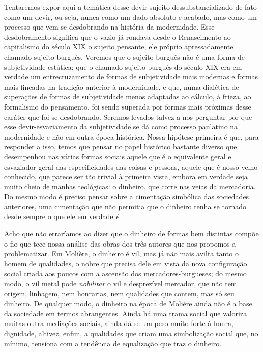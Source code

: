 Tentaremos expor aqui a temática desse devir-sujeito-dessubstancializado
de fato como um devir, ou seja, nunca como um dado absoluto e acabado,
mas como um processo que vem se desdobrando na história da modernidade.
Esse desdobramento significa que o vazio já rondava desde o Renascimento
ao capitalismo do século XIX o sujeito pensante, ele próprio
apressadamente chamado sujeito burguês. Veremos que o sujeito burguês
não é uma forma de subjetividade estática; que o chamado sujeito burguês
do século XIX era em verdade um entrecruzamento de formas de
subjetividade mais modernas e formas mais fincadas na tradição anterior
à modernidade, e que, numa dialética de superações de formas de
subjetividade menos adaptadas ao cálculo, à frieza, ao formalismo do
pensamento, foi sendo superada por formas mais próximas desse caráter
que foi se desdobrando. Seremos levados talvez a nos perguntar por que
esse devir-esvaziamento da subjetividade se dá como processo paulatino
na modernidade e não em outra época histórica. Nossa hipótese primeira é
que, para responder a isso, temos que pensar no papel histórico bastante
diverso que desempenhou nas várias formas sociais aquele que é o
equivalente geral e esvaziador geral das especificidades das coisas e
pessoas, aquele que é nosso velho conhecido, que parece ser tão trivial
à primeira vista, embora em verdade seja muito cheio de manhas
teológicas: o dinheiro, que corre nas veias da mercadoria. Do mesmo modo
é preciso pensar sobre a cimentação simbólica das sociedades anteriores,
uma cimentação que não permitia que o dinheiro tenha se tornado desde
sempre o que ele em verdade \emph{é}.

Acho que não erraríamos ao dizer que o dinheiro de formas bem distintas
compõe o fio que tece nossa análise das obras dos três autores que nos
propomos a problematizar. Em Molière, o dinheiro é vil, mas já não mais
avilta tanto o homem de qualidades, o nobre que precisa dele em vista da
nova configuração social criada aos poucos com a ascensão dos
mercadores-burgueses; do mesmo modo, o vil metal pode \emph{nobilitar} o
vil e desprezível mercador, que não tem origem, linhagem, nem honrarias,
nem qualidades que contem, mas só seu dinheiro. De qualquer modo, o
dinheiro na época de Molière ainda não é a base da sociedade em termos
abrangentes. Ainda há uma trama social que valoriza muitas outra
mediações sociais, ainda dá-se um peso muito forte à honra, dignidade,
altivez, enfim, a qualidades que criam uma simbolização social que, no
mínimo, tensiona com a tendência de equalização que traz o dinheiro.


